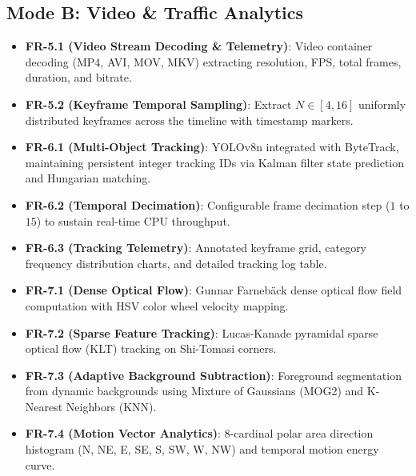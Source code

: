\documentclass[12pt,a4paper]{article}
\begin{document}
\subsection{Mode B: Video \& Traffic Analytics}
\begin{itemize}
    \item \textbf{FR-5.1 (Video Stream Decoding \& Telemetry)}: Video container decoding (MP4, AVI, MOV, MKV) extracting resolution, FPS, total frames, duration, and bitrate.
    \item \textbf{FR-5.2 (Keyframe Temporal Sampling)}: Extract $N \in [4, 16]$ uniformly distributed keyframes across the timeline with timestamp markers.
    \item \textbf{FR-6.1 (Multi-Object Tracking)}: YOLOv8n integrated with ByteTrack, maintaining persistent integer tracking IDs via Kalman filter state prediction and Hungarian matching.
    \item \textbf{FR-6.2 (Temporal Decimation)}: Configurable frame decimation step ($1$ to $15$) to sustain real-time CPU throughput.
    \item \textbf{FR-6.3 (Tracking Telemetry)}: Annotated keyframe grid, category frequency distribution charts, and detailed tracking log table.
    \item \textbf{FR-7.1 (Dense Optical Flow)}: Gunnar Farneb\"ack dense optical flow field computation with HSV color wheel velocity mapping.
    \item \textbf{FR-7.2 (Sparse Feature Tracking)}: Lucas-Kanade pyramidal sparse optical flow (KLT) tracking on Shi-Tomasi corners.
    \item \textbf{FR-7.3 (Adaptive Background Subtraction)}: Foreground segmentation from dynamic backgrounds using Mixture of Gaussians (MOG2) and K-Nearest Neighbors (KNN).
    \item \textbf{FR-7.4 (Motion Vector Analytics)}: 8-cardinal polar area direction histogram (N, NE, E, SE, S, SW, W, NW) and temporal motion energy curve.
\end{itemize}
\end{document}
